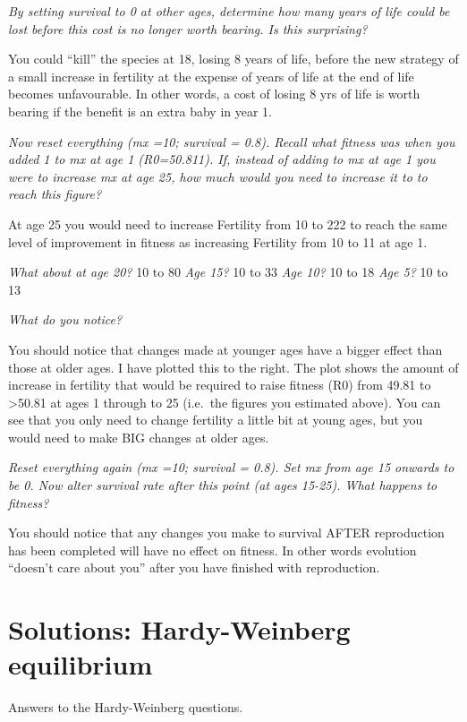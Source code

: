 \documentclass[
  a4paper]{book}
\begin{document}
\emph{By setting survival to 0 at other ages, determine how many years of life could be lost before this cost is no longer worth bearing. Is this surprising?}

You could ``kill'' the species at 18, losing 8 years of life, before the new strategy of a small increase in fertility at the expense of years of life at the end of life becomes unfavourable. In other words, a cost of losing 8 yrs of life is worth bearing if the benefit is an extra baby in year 1.

\emph{Now reset everything (mx =10; survival = 0.8). Recall what fitness was when you added 1 to mx at age 1 (R0=50.811).
If, instead of adding to mx at age 1 you were to increase mx at age 25, how much would you need to increase it to to reach this figure?}

At age 25 you would need to increase Fertility from 10 to 222 to reach the same level of improvement in fitness as increasing Fertility from 10 to 11 at age 1.

\emph{What about at age 20?} 10 to 80
\emph{Age 15?} 10 to 33
\emph{Age 10?} 10 to 18
\emph{Age 5?} 10 to 13

\emph{What do you notice?}

You should notice that changes made at younger ages have a bigger effect than those at older ages. I have plotted this to the right. The plot shows the amount of increase in fertility that would be required to raise fitness (R0) from 49.81 to \textgreater50.81 at ages 1 through to 25 (i.e.~the figures you estimated above). You can see that you only need to change fertility a little bit at young ages, but you would need to make BIG changes at older ages.

\emph{Reset everything again (mx =10; survival = 0.8). Set mx from age 15 onwards to be 0. Now alter survival rate after this point (at ages 15-25). What happens to fitness?}

You should notice that any changes you make to survival AFTER reproduction has been completed will have no effect on fitness. In other words evolution ``doesn't care about you'' after you have finished with reproduction.

\hypertarget{solutions-hardy-weinberg-equilibrium}{%
\section{Solutions: Hardy-Weinberg equilibrium}\label{solutions-hardy-weinberg-equilibrium}}

Answers to the Hardy-Weinberg questions.
\end{document}
